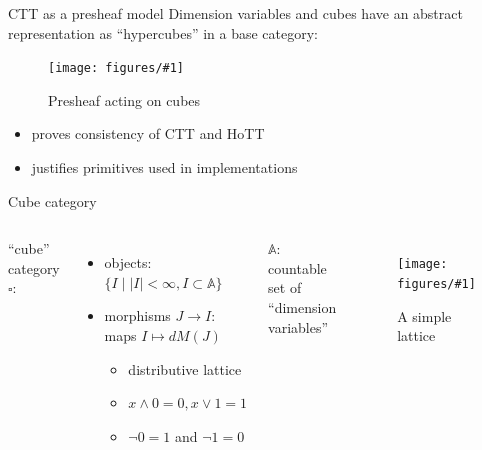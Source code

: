 \documentclass[english,draft]{beamer}
\newcommand{\fig}[2]{
    \begin{figure}\begin{center}\texttt{[image: figures/\#1]}\caption{#2\label{#1}}\end{center}
    \end{figure}}
\begin{document}
\begin{frame}{CTT as a presheaf model}
    Dimension variables and cubes have an abstract representation as ``hypercubes'' in a base category:
    
    \fig{cube_presheaf}{Presheaf acting on cubes}

    \begin{itemize}
        \item proves consistency of CTT and HoTT
        \item justifies primitives used in implementations
    \end{itemize}
    
\end{frame}

\begin{frame}{Cube category}

%  
%  


  \begin{columns}[c]
        

        ``cube'' category $\square$: 
        \begin{itemize}
            \item objects: $\{ I \mid |I| < \infty , I \subset \mathbb{A} \}$
            \item morphisms $J\rightarrow I$: maps $I \mapsto dM(J)$
            \begin{itemize}
                \item distributive lattice
                \item  $x \wedge 0 = 0, x\vee 1 = 1$
                \item $\neg 0 = 1$ and $ \neg 1 =0$
            \end{itemize}
        \end{itemize}
$\mathbb{A}$: countable set of ``dimension variables'' 
        \fig{lattice}{A simple lattice}
\end{columns}
 
 
\end{frame}
\end{document}
